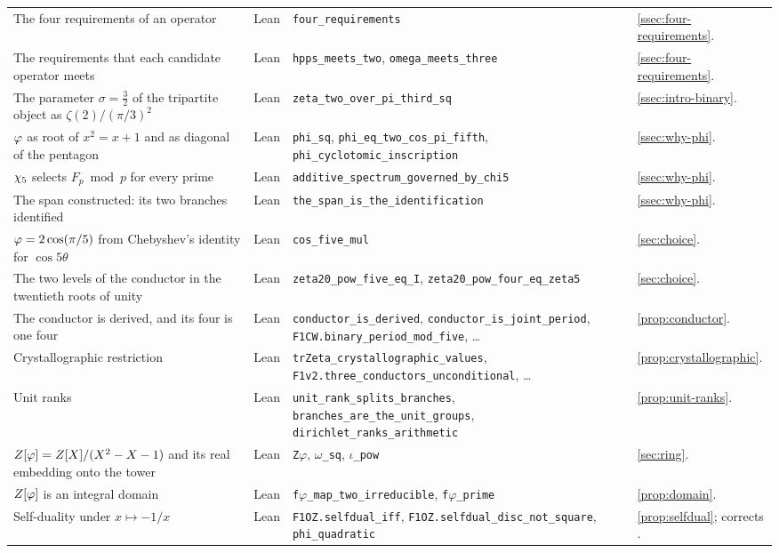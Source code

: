 {\begin{longtable}{>{\raggedright\arraybackslash}p{}>{\raggedright\arraybackslash}p{}>{\raggedright\arraybackslash}p{}>{\raggedright\arraybackslash}p{}}
The four requirements of an operator & Lean & \texttt{four\_requirements} & \cref{ssec:four-requirements}.\\
The requirements that each candidate operator meets & Lean & \texttt{hpps\_meets\_two}, \texttt{omega\_meets\_three} & \cref{ssec:four-requirements}.\\
The parameter $\sigma=\tfrac32$ of the tripartite object as $\zeta(2)/(\pi/3)^2$ & Lean & \texttt{zeta\_two\_over\_pi\_third\_sq} & \cref{ssec:intro-binary}.\\
$\varphi$ as root of $x^2=x+1$ and as diagonal of the pentagon & Lean & \texttt{phi\_sq}, \texttt{phi\_eq\_two\_cos\_pi\_fifth}, \texttt{phi\_cyclotomic\_inscription} & \cref{ssec:why-phi}.\\
$\chi_5$ selects $F_p\bmod p$ for every prime & Lean & \texttt{additive\_spectrum\_governed\_by\_chi5} & \cref{ssec:why-phi}.\\
The span constructed: its two branches identified & Lean & \texttt{the\_span\_is\_the\_identification} & \cref{ssec:why-phi}.\\
$\varphi=2\cos(\pi/5)$ from Chebyshev's identity for $\cos5\theta$ & Lean & \texttt{cos\_five\_mul} & \cref{sec:choice}.\\
The two levels of the conductor in the twentieth roots of unity & Lean & \texttt{zeta20\_pow\_five\_eq\_I}, \texttt{zeta20\_pow\_four\_eq\_zeta5} & \cref{sec:choice}.\\
The conductor is derived, and its four is one four & Lean & \texttt{conductor\_is\_derived}, \texttt{conductor\_is\_joint\_period}, \texttt{F1CW.binary\_period\_mod\_five}, \dots & \cref{prop:conductor}.\\
Crystallographic restriction & Lean & \texttt{trZeta\_crystallographic\_values}, \texttt{F1v2.three\_conductors\_unconditional}, \dots & \cref{prop:crystallographic}.\\
Unit ranks & Lean & \texttt{unit\_rank\_splits\_branches}, \texttt{branches\_are\_the\_unit\_groups}, \texttt{dirichlet\_ranks\_arithmetic} & \cref{prop:unit-ranks}.\\
$Z[\varphi]=Z[X]/(X^2-X-1)$ and its real embedding onto the tower & Lean & \texttt{Z\ensuremath{\varphi}}, \texttt{\ensuremath{\omega}\_sq}, \texttt{\ensuremath{\iota}\_pow} & \cref{sec:ring}.\\
$Z[\varphi]$ is an integral domain & Lean & \texttt{f\ensuremath{\varphi}\_map\_two\_irreducible}, \texttt{f\ensuremath{\varphi}\_prime} & \cref{prop:domain}.\\
Self-duality under $x\mapsto-1/x$ & Lean & \texttt{F1OZ.selfdual\_iff}, \texttt{F1OZ.selfdual\_disc\_not\_square}, \texttt{phi\_quadratic} & \cref{prop:selfdual}; corrects \cite{gonzalez26oddzeta}.\\

\end{longtable}}
